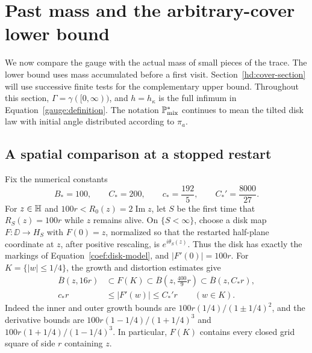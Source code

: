 \section{Past mass and the arbitrary-cover lower bound}
\label{hd:section}

We now compare the gauge with the actual mass of small pieces of the
trace. The lower bound uses mass accumulated before a first visit.
Section~\ref{hd:cover-section} will use successive finite tests for
the complementary upper bound. Throughout this section,
\(\Gamma=\gamma([0,\infty))\), and \(h=h_\kappa\) is the full
infimum in Equation~\eqref{gauge:definition}.
The notation \(\mathbb P^*_{\mathrm{mix}}\) continues to mean the tilted
disk law with initial angle distributed according to \(\pi_a\).

\subsection{A spatial comparison at a stopped restart}
\label{hd:spatial}

Fix the numerical constants
\begin{equation}
 B_*=100,\qquad C_*=200,\qquad
 c_*=\frac{192}{5},\qquad C_*'=\frac{8000}{27}.
 \label{hd:koebe-constants}
\end{equation}
For \(z\in\mathbb H\) and \(100r<R_0(z)=2\operatorname{Im}z\), let \(S\)
be the first time that \(R_S(z)=100r\) while \(z\) remains alive.
On \(\{S<\infty\}\), choose a disk map
\(F:\DD\longrightarrow H_S\) with \(F(0)=z\), normalized so that
the restarted half-plane coordinate at \(z\), after positive
rescaling, is \(e^{i\theta_S(z)}\). Thus the disk has exactly the
markings of Equation~\eqref{coef:disk-model}, and
\(|F'(0)|=100r\).
For \(K=\{|w|\le1/4\}\), the growth and distortion estimates give
\begin{align}
 \overline B(z,16r)&\subset F(K)
       \subset\overline B\left(z,\frac{400}{9}r\right)
       \subset\overline B(z,C_*r), \label{hd:koebe-sets}\\
 c_*r&\le |F'(w)|\le C_*'r\qquad(w\in K).
 \label{hd:koebe-derivatives}
\end{align}
Indeed the inner and outer growth bounds are
\(100r(1/4)/(1\pm1/4)^2\), and the derivative bounds are
\(100r(1-1/4)/(1+1/4)^3\) and
\(100r(1+1/4)/(1-1/4)^3\).
In particular, \(F(K)\) contains every closed grid square of side
\(r\) containing \(z\).

